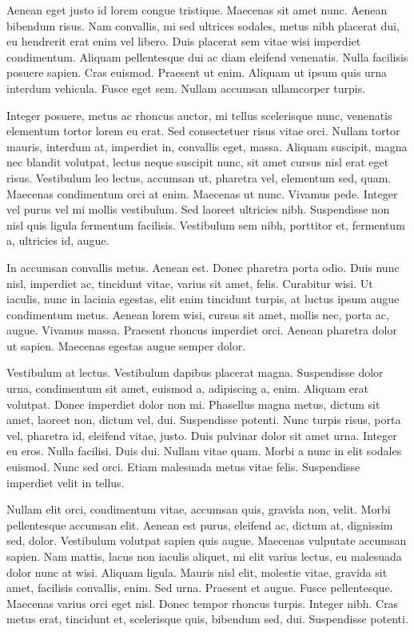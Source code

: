 \documentclass{article}
\begin{document}
Aenean eget justo id lorem congue tristique. Maecenas sit amet nunc. Aenean
bibendum risus. Nam convallis, mi sed ultrices sodales, metus nibh placerat
dui, eu hendrerit erat enim vel libero. Duis placerat sem vitae wisi imperdiet
condimentum. Aliquam pellentesque dui ac diam eleifend venenatis. Nulla
facilisis posuere sapien. Cras euismod. Praesent ut enim. Aliquam ut ipsum quis
urna interdum vehicula. Fusce eget sem. Nullam accumsan ullamcorper turpis.

Integer posuere, metus ac rhoncus auctor, mi tellus scelerisque nunc,
venenatis elementum tortor lorem eu erat. Sed consectetuer risus vitae orci.
Nullam tortor mauris, interdum at, imperdiet in, convallis eget, massa. Aliquam
suscipit, magna nec blandit volutpat, lectus neque suscipit nunc, sit amet
cursus nisl erat eget risus. Vestibulum leo lectus, accumsan ut, pharetra vel,
elementum sed, quam. Maecenas condimentum orci at enim. Maecenas ut nunc.
Vivamus pede. Integer vel purus vel mi mollis vestibulum. Sed laoreet ultricies
nibh. Suspendisse non nisl quis ligula fermentum facilisis. Vestibulum sem
nibh, porttitor et, fermentum a, ultricies id, augue.

In accumsan convallis metus. Aenean est. Donec pharetra porta odio. Duis
nunc nisl, imperdiet ac, tincidunt vitae, varius sit amet, felis. Curabitur
wisi. Ut iaculis, nunc in lacinia egestas, elit enim tincidunt turpis, at
luctus ipsum augue condimentum metus. Aenean lorem wisi, cursus sit amet,
mollis nec, porta ac, augue. Vivamus massa. Praesent rhoncus imperdiet orci.
Aenean pharetra dolor ut sapien. Maecenas egestas augue semper dolor.

Vestibulum at lectus. Vestibulum dapibus placerat magna. Suspendisse dolor
urna, condimentum sit amet, euismod a, adipiscing a, enim. Aliquam erat
volutpat. Donec imperdiet dolor non mi. Phasellus magna metus, dictum sit amet,
laoreet non, dictum vel, dui. Suspendisse potenti. Nunc turpis risus, porta
vel, pharetra id, eleifend vitae, justo. Duis pulvinar dolor sit amet urna.
Integer eu eros. Nulla facilisi. Duis dui. Nullam vitae quam. Morbi a nunc in
elit sodales euismod. Nunc sed orci. Etiam malesuada metus vitae felis.
Suspendisse imperdiet velit in tellus.

Nullam elit orci, condimentum vitae, accumsan quis, gravida non, velit. Morbi
pellentesque accumsan elit. Aenean est purus, eleifend ac, dictum at, dignissim
sed, dolor. Vestibulum volutpat sapien quis augue. Maecenas vulputate accumsan
sapien. Nam mattis, lacus non iaculis aliquet, mi elit varius lectus, eu
malesuada dolor nunc at wisi. Aliquam ligula. Mauris nisl elit, molestie vitae,
gravida sit amet, facilisis convallis, enim. Sed urna. Praesent et augue. Fusce
pellentesque. Maecenas varius orci eget nisl. Donec tempor rhoncus turpis.
Integer nibh. Cras metus erat, tincidunt et, scelerisque quis, bibendum sed,
dui. Suspendisse potenti.
\end{document}
